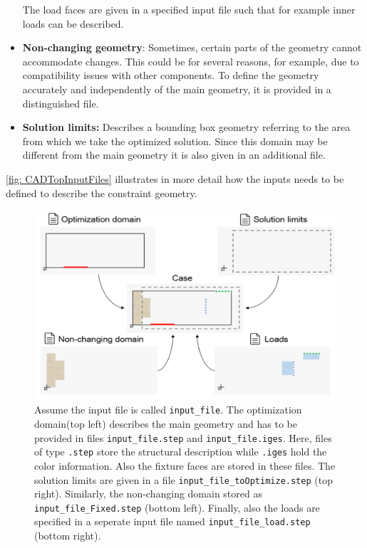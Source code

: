 \begin{itemize}
The load faces are given in a specified input file such that for example inner loads can be described.

	\item \textbf{Non-changing geometry}: Sometimes, certain parts of the geometry cannot accommodate changes. This could be for several reasons, for example, due to compatibility issues with other components. To define the geometry accurately and independently of the main geometry, it is provided in a distinguished file.%
	\item \textbf{Solution limits:} Describes a bounding box geometry referring to the area from which we take the optimized solution. Since this domain may be different from the main geometry it is also given in an additional file.
\end{itemize}

\autoref{fig: CADTopInputFiles} illustrates in more detail how the inputs needs to be defined to describe the constraint geometry. 

\begin{figure}[ht]
\includegraphics[width=\textwidth]{Pictures/four_files.png}
\caption{Assume the input file is called \texttt{input{\_}file}. The optimization domain(top left) describes the main geometry and has to be provided in files \texttt{input{\_}file.step} and \texttt{input{\_}file.iges}. Here, files of type \texttt{.step} store the structural description while \texttt{.iges} hold the color information. Also the fixture faces are stored in these files. The solution limits are given in a file \texttt{input{\_}file{\_}toOptimize.step} (top right). Similarly, the non-changing domain stored as \texttt{input{\_}file{\_}Fixed.step} (bottom left). Finally, also the loads are specified in a seperate input file named \texttt{input{\_}file{\_}load.step} (bottom right).}
\label{fig: CADTopInputFiles}
\end{figure}
